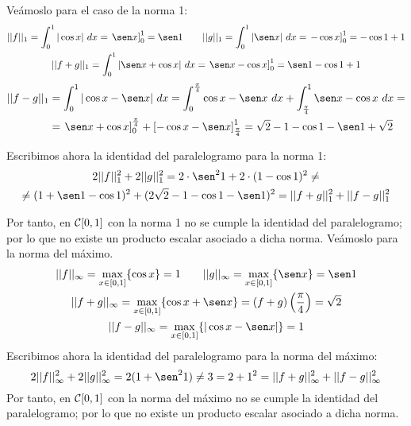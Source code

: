 \begin{ejercicio}
    Veámoslo para el caso de la norma 1:
    \begin{gather*}
        ||f||_1 = \int_0^1 |\cos x|~dx = \left.\sen x\right]_0^1 = \sen 1 \qquad
        ||g||_1 = \int_0^1 |\sen x|~dx = \left.-\cos x\right]_0^1 = -\cos 1 +1 \\
        ||f+g||_1 = \int_0^1 |\sen x +\cos x|~dx = \left.\sen x -\cos x\right]_0^1 = \sen 1 -\cos 1 +1
    \end{gather*}
    \begin{equation*}
        \begin{split}
            ||f-g||_1 &= \int_0^1 |\cos x -\sen x|~dx =\int_0^{\frac{\pi}{4}} \cos x -\sen x~dx + \int_{\frac{\pi}{4}}^1 \sen x -\cos x~dx =\\
            &= \left.\sen x +\cos x\right]_0^{\frac{\pi}{4}} + \left[-\cos x -\sen x\right]_{\frac{\pi}{4}}^1 = \sqrt{2}-1-\cos 1 -\sen 1+\sqrt{2}
        \end{split}
    \end{equation*}

    Escribimos ahora la identidad del paralelogramo para la norma 1:
    \begin{multline*}
        2||f||_1^2 + 2||g||_1^2 = 2\cdot \sen^2 1 +2\cdot (1-\cos 1)^2  \neq \\ \neq
        (1+\sen 1 -\cos 1)^2 + (2\sqrt{2}-1-\cos 1 -\sen 1)^2 = ||f+g||_1^2 + ||f-g||_1^2
    \end{multline*}

    Por tanto, en $\mathcal{C}[0,1]$ con la norma 1 no se cumple la identidad del paralelogramo; por lo que no existe un producto escalar asociado a dicha norma. Veámoslo para la norma del máximo.
    \begin{gather*}
        ||f||_\infty = \max_{x\in [0,1]}\{\cos x\} = 1 \qquad
        ||g||_\infty = \max_{x\in [0,1]}\{\sen x\} = \sen 1 \\
        ||f+g||_\infty = \max_{x\in [0,1]}\{\cos x + \sen x\} = (f+g)\left(\frac{\pi}{4}\right)=\sqrt{2} \\
        ||f-g||_\infty = \max_{x\in [0,1]}\{|\cos x - \sen x|\} = 1
    \end{gather*}
    Escribimos ahora la identidad del paralelogramo para la norma del máximo:
    \begin{equation*}
        2||f||_\infty^2 + 2||g||_\infty^2 = 2(1+\sen^2 1)  \neq 3=
        2 + 1^2 = ||f+g||_\infty^2 + ||f-g||_\infty^2
    \end{equation*}
    Por tanto, en $\mathcal{C}[0,1]$ con la norma del máximo no se cumple la identidad del paralelogramo; por lo que no existe un producto escalar asociado a dicha norma.
\end{ejercicio}

